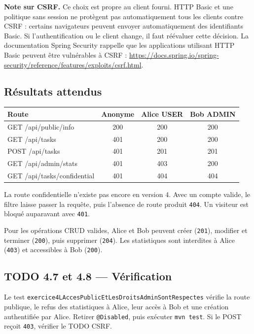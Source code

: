 \documentclass[11pt,a4paper]{article}
\begin{document}
\textbf{Note sur CSRF.} Ce choix est propre au client fourni. HTTP Basic et une politique sans session ne protègent pas automatiquement tous les clients contre CSRF : certains navigateurs peuvent envoyer automatiquement des identifiants Basic. Si l’authentification ou le client change, il faut réévaluer cette décision. La documentation Spring Security rappelle que les applications utilisant HTTP Basic peuvent être vulnérables à CSRF : \url{https://docs.spring.io/spring-security/reference/features/exploits/csrf.html}.

\subsection{Résultats attendus}

\begin{center}
\begin{tabular}{l c c c}
\toprule
Route & Anonyme & Alice USER & Bob ADMIN \\
\midrule
GET /api/public/info & 200 & 200 & 200 \\
GET /api/tasks & 401 & 200 & 200 \\
POST /api/tasks & 401 & 201 & 201 \\
GET /api/admin/stats & 401 & 403 & 200 \\
GET /api/tasks/confidential & 401 & 404 & 404 \\
\bottomrule
\end{tabular}
\end{center}

La route confidentielle n’existe pas encore en version 4. Avec un compte valide, le filtre laisse passer la requête, puis l’absence de route produit \texttt{404}. Un visiteur est bloqué auparavant avec \texttt{401}.

Pour les opérations CRUD valides, Alice et Bob peuvent créer (\texttt{201}), modifier et terminer (\texttt{200}), puis supprimer (\texttt{204}). Les statistiques sont interdites à Alice (\texttt{403}) et accessibles à Bob (\texttt{200}).

\subsection{TODO 4.7 et 4.8 — Vérification}

Le test \texttt{exercice4LAccesPublicEtLesDroitsAdminSontRespectes} vérifie la route publique, le refus des statistiques à Alice, leur accès à Bob et une création authentifiée par Alice. Retirer \texttt{@Disabled}, puis exécuter \texttt{mvn test}. Si le POST reçoit \texttt{403}, vérifier le TODO CSRF.
\end{document}
